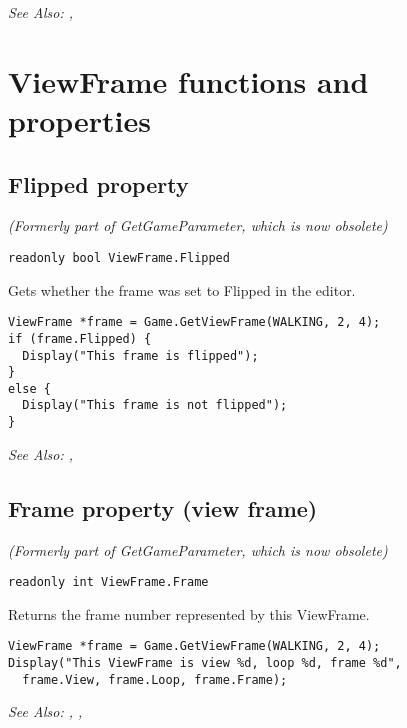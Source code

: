 \it{See Also:} , 


\section{ViewFrame functions and properties}


\subsection{Flipped property}\label{ViewFrame.Flipped}%

\it{(Formerly part of GetGameParameter, which is now obsolete)}

\begin{verbatim}
readonly bool ViewFrame.Flipped
\end{verbatim}
Gets whether the frame was set to Flipped in the editor.

\begin{verbatim}
ViewFrame *frame = Game.GetViewFrame(WALKING, 2, 4);
if (frame.Flipped) {
  Display("This frame is flipped");
}
else {
  Display("This frame is not flipped");
}
\end{verbatim}

\it{See Also:} ,


\subsection{Frame property (view frame)}\label{ViewFrame.Frame}%

\it{(Formerly part of GetGameParameter, which is now obsolete)}

\begin{verbatim}
readonly int ViewFrame.Frame
\end{verbatim}
Returns the frame number represented by this ViewFrame.

\begin{verbatim}
ViewFrame *frame = Game.GetViewFrame(WALKING, 2, 4);
Display("This ViewFrame is view %d, loop %d, frame %d",
  frame.View, frame.Loop, frame.Frame);
\end{verbatim}

\it{See Also:} ,
,


